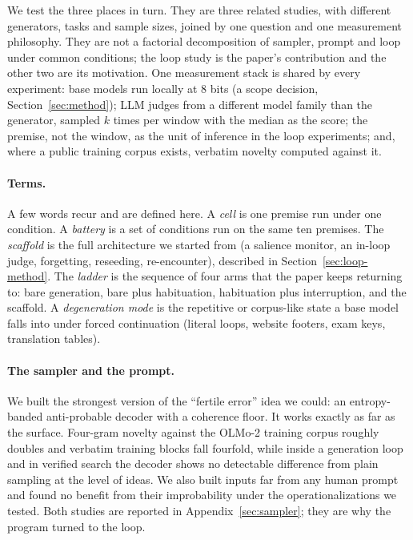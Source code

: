 We test the three places in turn. They are three related studies, with
different generators, tasks and sample sizes, joined by one question and
one measurement philosophy. They are not a factorial decomposition of
sampler, prompt and loop under common conditions; the loop study is the
paper's contribution and the other two are its motivation. One measurement
stack is shared by every experiment: base models run locally at 8 bits (a
scope decision, Section~\ref{sec:method}); LLM judges from a different
model family than the generator, sampled $k$ times per window with the
median as the score; the premise, not the window, as the unit of inference
in the loop experiments; and, where a public training corpus exists,
verbatim novelty computed against it.

\paragraph{Terms.} A few words recur and are defined here. A \emph{cell} is
one premise run under one condition. A \emph{battery} is a set of conditions
run on the same ten premises. The \emph{scaffold} is the full architecture
we started from (a salience monitor, an in-loop judge, forgetting,
reseeding, re-encounter), described in Section~\ref{sec:loop-method}. The
\emph{ladder} is the sequence of four arms that the paper keeps returning
to: bare generation, bare plus habituation, habituation plus interruption,
and the scaffold. A \emph{degeneration mode} is the repetitive or
corpus-like state a base model falls into under forced continuation
(literal loops, website footers, exam keys, translation tables).

\paragraph{The sampler and the prompt.} We built the strongest version of
the ``fertile error'' idea we could: an entropy-banded anti-probable decoder
with a coherence floor. It works exactly as far as the surface. Four-gram
novelty against the OLMo-2 training corpus roughly doubles and verbatim
training blocks fall fourfold, while inside a generation loop and in
verified search the decoder shows no detectable difference from plain
sampling at the level of ideas. We also built inputs far from any human
prompt and found no benefit from their improbability under the
operationalizations we tested. Both studies are reported in
Appendix~\ref{sec:sampler}; they are why the program turned to the loop.

